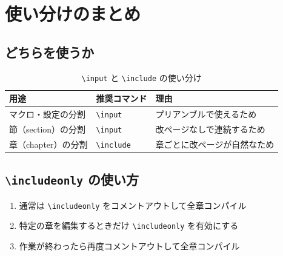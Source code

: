 
\chapter{使い分けのまとめ}

\section{どちらを使うか}

\begin{table}[h]
  \centering
  \begin{tabular}{lll}
    \hline
    用途 & 推奨コマンド & 理由 \\
    \hline
    マクロ・設定の分割    & \texttt{\textbackslash input}   & プリアンブルで使えるため \\
    節（section）の分割   & \texttt{\textbackslash input}   & 改ページなしで連続するため \\
    章（chapter）の分割   & \texttt{\textbackslash include} & 章ごとに改ページが自然なため \\
    \hline
  \end{tabular}
  \caption{\texttt{\textbackslash input} と \texttt{\textbackslash include} の使い分け}
\end{table}

\section{\texttt{\textbackslash includeonly} の使い方}

\begin{enumerate}
  \item 通常は \texttt{\textbackslash includeonly} をコメントアウトして全章コンパイル
  \item 特定の章を編集するときだけ \texttt{\textbackslash includeonly} を有効にする
  \item 作業が終わったら再度コメントアウトして全章コンパイル
\end{enumerate}
